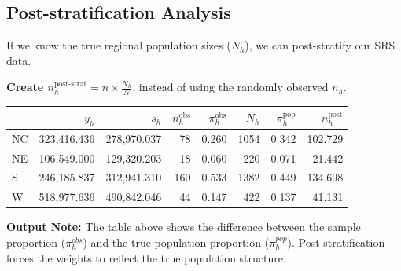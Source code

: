 \documentclass[
  letterpaper,
  DIV=11,
  numbers=noendperiod]{scrreprt}
\renewcommand{\[}{\begin{equation}}
\renewcommand{\]}{\end{equation}}
\begin{document}
\subsection{Post-stratification
Analysis}\label{post-stratification-analysis}

If we know the true regional population sizes (\(N_h\)), we can
post-stratify our SRS data.

\textbf{Create \(n_h^{\text{post-strat}} = n \times \frac{N_h}{N}\)},
instead of using the randomly observed \(n_h\).

\begin{table}
\fontsize{12.0pt}{14.0pt}\selectfont
\begin{tabular*}{\linewidth}{@{\extracolsep{\fill}}l|rrrrrrr}
\toprule
 & \(\bar{y}_h\) & \(s_h\) & \(n_h^{\text{obs}}\) & \(\pi^{\text{obs}}_h\) & \(N_h\) & \(\pi^{\text{pop}}_h\) & \(n_h^{\text{post}}\) \\ 
\midrule\addlinespace[2.5pt]
NC & 323,416.436 & 278,970.037 & 78 & 0.260 & 1054 & 0.342 & 102.729 \\ 
NE & 106,549.000 & 129,320.203 & 18 & 0.060 & 220 & 0.071 & 21.442 \\ 
S & 246,185.837 & 312,941.310 & 160 & 0.533 & 1382 & 0.449 & 134.698 \\ 
W & 518,977.636 & 490,842.046 & 44 & 0.147 & 422 & 0.137 & 41.131 \\ 
\bottomrule
\end{tabular*}
\end{table}

\textbf{Output Note:} The table above shows the difference between the
sample proportion (\(\pi^{obs}_h\)) and the true population proportion
(\(\pi^{pop}_h\)). Post-stratification forces the weights to reflect the
true population structure.
\end{document}

